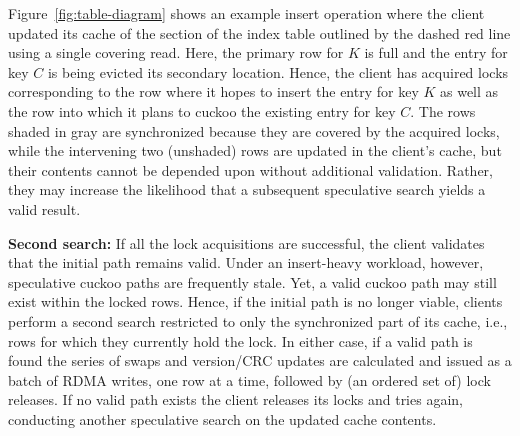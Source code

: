 Figure~\ref{fig:table-diagram} shows an example insert
operation where the client updated its cache of the section
of the index table outlined by the dashed red line using a
single covering read.  Here, the primary row for $K$ is full
and the entry for key $C$ is being evicted its secondary
location.  Hence, the client has acquired locks
corresponding to the row where it hopes to insert the entry
for key $K$ as well as the row into which it plans to cuckoo
the existing entry for key $C$.  The rows shaded in gray are
synchronized because they are covered by the acquired locks,
while the intervening two (unshaded) rows are updated in the
client's cache, but their contents cannot be depended upon
without additional validation.  Rather, they may increase
the likelihood that a subsequent speculative search yields a
valid result.

\textbf{Second search:} If all the lock acquisitions are successful,
the client validates that the initial path remains valid.  Under an
insert-heavy workload, however, speculative cuckoo paths are
frequently stale.  Yet, a valid cuckoo path may still exist within the
locked rows.  Hence, if the initial path is no longer viable, clients
perform a second search restricted to only the synchronized part of
its cache, i.e., rows for which they currently hold the lock.  In
either case, if a valid path is found the series of swaps and
version/CRC updates are calculated and issued as a batch of RDMA
writes, one row at a time, followed by (an ordered set of) lock
releases. If no valid path exists the client releases its locks and
tries again, conducting another speculative search on the updated
cache contents.


